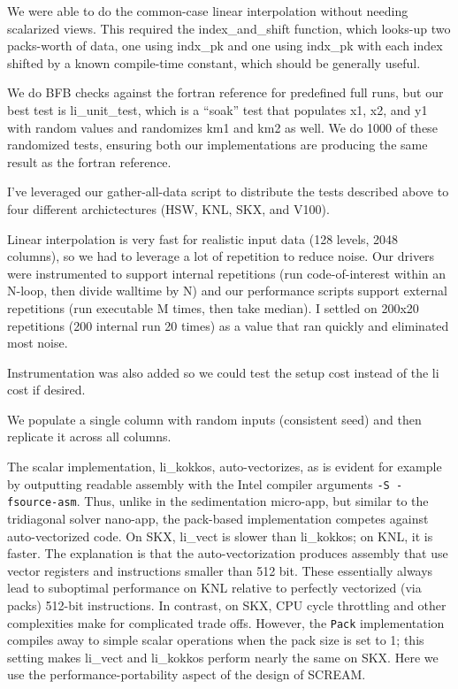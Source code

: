 \documentclass[10pt,twocolumn]{article}
\begin{document}
We were able to do the common-case linear interpolation without needing scalarized
views. This required the index\_and\_shift function, which looks-up two packs-worth
of data, one using indx\_pk and one using indx\_pk with each index shifted by a known
compile-time constant, which should be generally useful.


We do BFB checks against the fortran reference for predefined full runs, but our best test is
li\_unit\_test, which is a ``soak'' test that populates x1, x2, and y1 with random
values and randomizes km1 and km2 as well. We do 1000 of these randomized tests,
ensuring both our implementations are producing the same result as the fortran reference.

I've leveraged our gather-all-data script to distribute the tests described above to four different
archictectures (HSW, KNL, SKX, and V100).


Linear interpolation is very fast for realistic input data (128 levels, 2048 columns), so we
had to leverage a lot of repetition to reduce noise. Our drivers were instrumented to support
internal repetitions (run code-of-interest within an N-loop, then divide walltime by N) and our performance scripts
support external repetitions (run executable M times, then take median). I settled on
200x20 repetitions (200 internal run 20 times) as a value that ran quickly and eliminated
most noise.

Instrumentation was also added so we could test the setup cost instead of the li cost
if desired.

We populate a single column with random inputs (consistent seed) and then replicate it
across all columns.


The scalar implementation, li\_kokkos, auto-vectorizes,
as is evident for example by outputting readable assembly with the Intel compiler arguments {\tt -S -fsource-asm}.
Thus, unlike in the sedimentation micro-app, but similar to the tridiagonal solver nano-app,
the pack-based implementation competes against auto-vectorized code.
On SKX, li\_vect is slower than li\_kokkos;
on KNL, it is faster.
The explanation is that the auto-vectorization produces assembly that use vector registers and instructions smaller than 512 bit.
These essentially always lead to suboptimal performance on KNL relative to perfectly vectorized (via packs) 512-bit instructions.
In contrast, on SKX, CPU cycle throttling and other complexities make for complicated trade offs. 
However, the {\tt Pack} implementation compiles away to simple scalar operations when the pack size is set to 1;
this setting makes li\_vect and li\_kokkos perform nearly the same on SKX.
Here we use the performance-portability aspect of the design of SCREAM.
\end{document}
